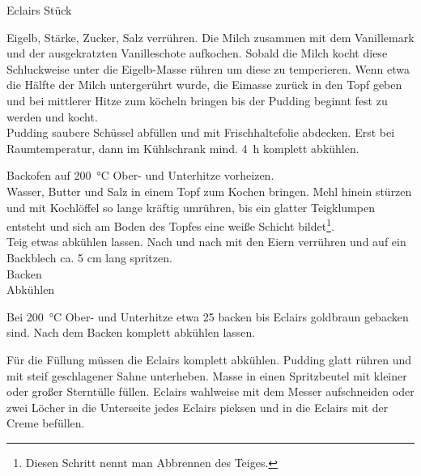 \begin{MyRecipe}{Eclairs}{ Stück}{}

	
	Eigelb, Stärke, Zucker, Salz verrühren. Die Milch zusammen mit dem Vanillemark und der ausgekratzten Vanilleschote aufkochen. Sobald die Milch kocht diese Schluckweise unter die Eigelb-Masse rühren um diese zu temperieren. Wenn etwa die Hälfte der Milch untergerührt wurde, die Eimasse zurück in den Topf geben und bei mittlerer Hitze zum köcheln bringen bis der Pudding beginnt fest zu werden und kocht.\\
	Pudding saubere Schüssel abfüllen und mit Frischhaltefolie abdecken. Erst bei Raumtemperatur, dann im Kühlschrank mind. \SI{4}{\hour} komplett abkühlen.\par\bigskip

	
	
	Backofen auf \SI{200}{\degreeCelsius} Ober- und Unterhitze vorheizen.\\
	Wasser, Butter und Salz in einem Topf zum Kochen bringen. Mehl hinein stürzen und mit Kochlöffel so lange kräftig umrühren, bis ein glatter Teigklumpen entsteht und sich am Boden des Topfes eine weiße Schicht bildet\footnote{Diesen Schritt nennt man Abbrennen des Teiges.}.\\
	Teig etwas abkühlen lassen. Nach und nach mit den Eiern verrühren und auf ein Backblech ca. 5 cm lang spritzen.\\
	Backen\\
	Abkühlen\par\bigskip
	
	Bei \SI{200}{\degreeCelsius} Ober- und Unterhitze etwa \SI{25}{\minuteprime} backen bis Eclairs goldbraun gebacken sind. Nach dem Backen komplett abkühlen lassen.\par\bigskip
		
	
	Für die Füllung müssen die Eclairs komplett abkühlen. Pudding glatt rühren und mit steif geschlagener Sahne unterheben. Masse in einen Spritzbeutel mit kleiner oder großer Sterntülle füllen. Eclairs wahlweise mit dem Messer aufschneiden oder zwei Löcher in die Unterseite jedes Eclairs pieksen und in die Eclairs mit der Creme befüllen.\par\bigskip
	

\end{MyRecipe}
